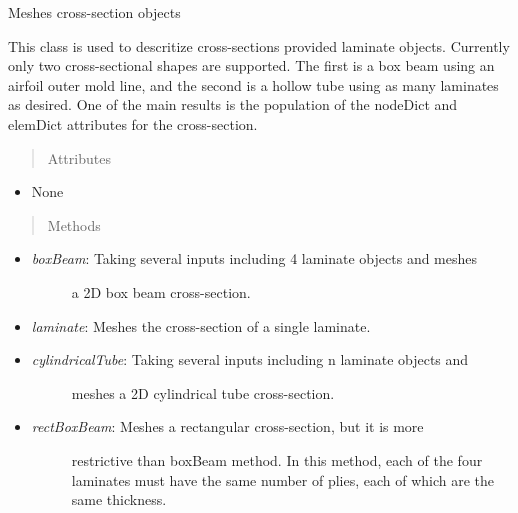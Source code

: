 \documentclass[letterpaper,10pt,english]{sphinxmanual}
\begin{document}
\begin{fulllineitems}
\label{structures:AeroComBAT.Structures.Mesher}
Meshes cross-section objects

This class is used to descritize cross-sections provided laminate objects.
Currently only two cross-sectional shapes are supported. The first is a
box beam using an airfoil outer mold line, and the second is a hollow tube
using as many laminates as desired. One of the main results is the
population of the nodeDict and elemDict attributes for the cross-section.
\begin{quote}\begin{description}
\item[{Attributes}] \leavevmode
\end{description}\end{quote}
\begin{itemize}
\item {} 
None

\end{itemize}
\begin{quote}\begin{description}
\item[{Methods}] \leavevmode
\end{description}\end{quote}
\begin{itemize}
\item {} \begin{description}
\item[{\emph{boxBeam}: Taking several inputs including 4 laminate objects and meshes}] \leavevmode
a 2D box beam cross-section.

\end{description}

\item {} 
\emph{laminate}: Meshes the cross-section of a single laminate.

\item {} \begin{description}
\item[{\emph{cylindricalTube}: Taking several inputs including n laminate objects and}] \leavevmode
meshes a 2D cylindrical tube cross-section.

\end{description}

\item {} \begin{description}
\item[{\emph{rectBoxBeam}: Meshes a rectangular cross-section, but it is more}] \leavevmode
restrictive than boxBeam method. In this method, each of the four
laminates must have the same number of plies, each of which are the
same thickness.


\end{description}
\end{itemize}
\end{fulllineitems}
\end{document}
